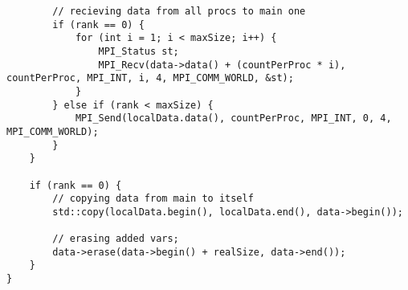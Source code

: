 \documentclass{report}
\begin{document}
\begin{lstlisting}
        // recieving data from all procs to main one
        if (rank == 0) {
            for (int i = 1; i < maxSize; i++) {
                MPI_Status st;
                MPI_Recv(data->data() + (countPerProc * i), countPerProc, MPI_INT, i, 4, MPI_COMM_WORLD, &st);
            }
        } else if (rank < maxSize) {
            MPI_Send(localData.data(), countPerProc, MPI_INT, 0, 4, MPI_COMM_WORLD);
        }
    }

    if (rank == 0) {
        // copying data from main to itself
        std::copy(localData.begin(), localData.end(), data->begin());

        // erasing added vars;
        data->erase(data->begin() + realSize, data->end());
    }
}
\end{lstlisting}
\end{document}
